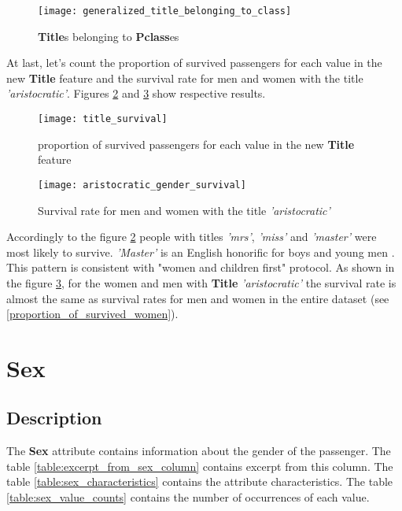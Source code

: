 \begin{figure}[!ht]
    \centering
    \texttt{[image: generalized\_title\_belonging\_to\_class]}
    \caption{\textbf{Title}s belonging to \textbf{Pclass}es}
    \label{pic:generalized_title_belonging_to_class}
\end{figure}

At last, let's count the proportion of survived passengers for each value
in the new \textbf{Title} feature and the survival rate for men and women
with the title \textit{'aristocratic'}. Figures \ref{pic:title_survival}
and \ref{pic:aristocratic_gender_survival} show respective results.

\begin{figure}[!ht]
    \centering
    \texttt{[image: title\_survival]}
    \caption{proportion of survived passengers for each value in the new
             \textbf{Title} feature}
    \label{pic:title_survival}
\end{figure}

\begin{figure}[!ht]
    \centering
    \texttt{[image: aristocratic\_gender\_survival]}
    \caption{Survival rate for men and women with the title 
             \textit{'aristocratic'}}
    \label{pic:aristocratic_gender_survival}
\end{figure}

Accordingly to the figure \ref{pic:title_survival} people with titles
\textit{'mrs'}, \textit{'miss'} and \textit{'master'} were most likely 
to survive. \textit{'Master'} is an English honorific for boys and young 
men \cite{english_honorics}. This pattern is consistent with "women and 
children first" protocol. As shown in the figure 
\ref{pic:aristocratic_gender_survival}, for the women and men with 
\textbf{Title} \textit{'aristocratic'} the survival rate is almost the 
same as survival rates for men and women in the entire dataset (see 
\ref{proportion_of_survived_women}).


\section{Sex} \label{section:Sex}
\subsection{Description}
The \textbf{Sex} attribute contains information about the gender of the 
passenger. The table \ref{table:excerpt_from_sex_column} contains excerpt 
from this column. The table \ref{table:sex_characteristics} contains the 
attribute characteristics. The table \ref{table:sex_value_counts} contains 
the number of occurrences of each value.

